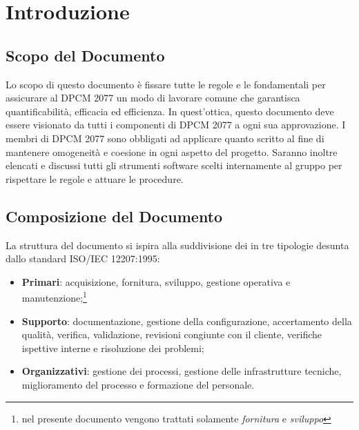 \section{Introduzione}

\subsection{Scopo del Documento}
Lo scopo di questo documento è fissare tutte le  regole e le  fondamentali per assicurare al  DPCM 2077 un modo di lavorare comune che garantisca quantificabilità, efficacia ed efficienza.
In quest’ottica, questo documento deve essere visionato da tutti i componenti di DPCM 2077 a ogni sua approvazione. 
I membri di DPCM 2077 sono obbligati ad applicare quanto scritto al fine di mantenere omogeneità e coesione in ogni aspetto del progetto. Saranno inoltre elencati e discussi tutti gli   
strumenti software scelti internamente al gruppo per rispettare le regole e attuare le procedure.

\subsection{Composizione del Documento}
La struttura del documento si ispira alla suddivisione dei  in tre tipologie desunta dallo standard ISO/IEC 12207:1995:
\begin{itemize}
\item{\textbf{Primari}: acquisizione, fornitura, sviluppo, gestione operativa e manutenzione;\footnote{nel presente documento vengono trattati solamente \textit{fornitura} e \textit{sviluppo}}}
\item{\textbf{Supporto}: documentazione, gestione della configurazione, accertamento della qualità, verifica, validazione, revisioni congiunte con il cliente, verifiche ispettive interne e risoluzione dei problemi;}
\item{\textbf{Organizzativi}: gestione dei processi, gestione delle infrastrutture tecniche, miglioramento del processo e formazione del personale.}
\end{itemize}
